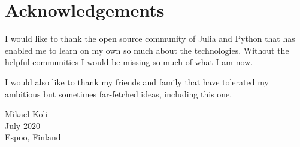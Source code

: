 \section*{Acknowledgements}

I would like to thank the open source community of Julia and Python
that has enabled me to learn on my own so much about the technologies.
Without the helpful communities I would be missing so much of what
I am now.

I would also like to thank my friends and family that have tolerated
my ambitious but sometimes far-fetched ideas, including this one.

Mikael Koli\\
July 2020\\ %
Espoo, Finland\\
